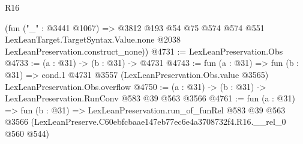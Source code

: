 \begin{lexlean}{R16}
\begin{coremodule}
      (fun ("_" : @3441 @1067) =>
      @3812
        @193
        @54
        @75
        @574
        @574
        @551
        LexLeanTarget.TargetSyntax.Value.none
        @2038
        LexLeanPreservation.construct_none))
@4731 := LexLeanPreservation.Obs
@4733 := (a : @31) -> (b : @31) -> @4731
@4743 := fun (a : @31) =>
  fun (b : @31) =>
  cond.{1} @4731 @3557 (LexLeanPreservation.Obs.value @3565) LexLeanPreservation.Obs.overflow
@4750 := (a : @31) -> (b : @31) -> LexLeanPreservation.RunConv @583 @39 @563 @3566
@4761 := fun (a : @31) =>
  fun (b : @31) =>
  LexLeanPreservation.run_of_funRel
    @583
    @39
    @563
    @3566
    (LexLeanPreserve.C60ebfcbaae147eb77ec6e4a3708732f4.R16.__rel_0 @560 @544)
\end{coremodule}
\end{lexlean}
